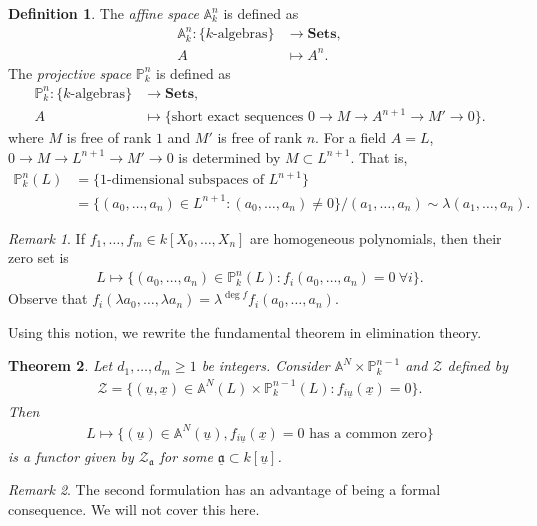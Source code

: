 \documentclass[12pt]{report}
\theoremstyle{plain}
\newtheorem{theorem}{Theorem}[section]
\theoremstyle{remark}
\newtheorem*{remark}{Remark}
\theoremstyle{definition}
\newtheorem{definition}[theorem]{Definition}
\begin{document}
\begin{definition}
    The \emph{affine space} $\mathbb{A}_k^n$ is defined as
    \begin{align*}
        \mathbb{A}_k^n : \{k\text{-algebras}\} &\to \mathbf{Sets}, \\
        A &\mapsto A^n.
    \end{align*}
    The \emph{projective space} $\mathbb{P}_k^n$ is defined as
    \begin{align*}
        \mathbb{P}_k^n : \{k\text{-algebras}\} &\to \mathbf{Sets}, \\
        A &\mapsto \{\text{short exact sequences }0\to M\to A^{n+1}\to M'\to 0\}.
    \end{align*}
    where $M$ is free of rank $1$ and $M'$ is free of rank $n$. For a field $A=L$, $0\to M\to L^{n+1}\to M'\to 0$ is determined by $M\subset L^{n+1}$. That is,
    \begin{align*}
        \mathbb{P}_k^n(L) &= \{1\text{-dimensional subspaces of }L^{n+1}\} \\
        &= \{(a_0,\dots,a_n)\in L^{n+1}:(a_0,\dots,a_n)\neq 0\}/(a_1,\dots,a_n)\sim \lambda (a_1,\dots,a_n).
    \end{align*}
\end{definition}
\begin{remark}
    If $f_1,\dots,f_m\in k[X_0,\dots,X_n]$ are homogeneous polynomials, then their zero set is
    \begin{align*}
        L\mapsto \{(a_0,\dots,a_n)\in \mathbb{P}_k^n(L):f_i(a_0,\dots,a_n)=0~\forall i\}.
    \end{align*}
    Observe that $f_i(\lambda a_0,\dots,\lambda a_n)=\lambda^{\deg f}f_i(a_0,\dots,a_n)$.
\end{remark}

Using this notion, we rewrite the fundamental theorem in elimination theory.

\begin{theorem}
    Let $d_1,\dots,d_m\ge 1$ be integers. Consider $\mathbb{A}^N\times \mathbb{P}_k^{n-1}$ and $\mathcal{Z}$ defined by
    \begin{align*}
        \mathcal{Z}=\{(\underline{u},\underline{x})\in\mathbb{A}^N(L)\times \mathbb{P}_k^{n-1}(L):f_{i\underline{u}}(\underline{x})=0\}.
    \end{align*}
    Then
    \begin{align*}
        L\mapsto \{(\underline{u})\in \mathbb{A}^N(\underline{u}),f_{i\underline{u}}(\underline{x})=0\text{ has a common zero}\}
    \end{align*}
    is a functor given by $\mathcal{Z}_\mathfrak{a}$ for some $\underline{\mathfrak{a}}\subset k[\underline{u}]$.
\end{theorem}
\begin{remark}
    The second formulation has an advantage of being a formal consequence. We will not cover this here.
\end{remark}
\end{document}
